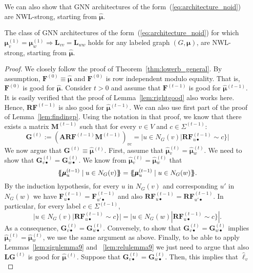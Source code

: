 We can also show that GNN architectures of the form~(\ref{eq:architecture_noid}) 
are NWL-strong, starting from $\hat{\pmb{\mu}}$.
\begin{proposition}
The class of GNN architectures of the form~(\ref{eq:architecture_noid}) for which 
	$\pmb{\mu}^{(1)}_v=\pmb{\mu}^{(1)}_w\Rightarrow  \mathbf{L}_{vv}=\mathbf{L}_{ww}$ holds for any labeled graph $(G,\pmb{\mu})$, are NWL-strong, starting from $\hat{\pmb{\mu}}$.
\end{proposition}
\begin{proof}
We closely follow the proof of Theorem~\ref{thm:lowerb_general}.
 By assumption, $\mathbf{F}^{(0)}\equiv \hat{\pmb{\mu}}$ and $\mathbf{F}^{(0)}$ is 
 row independent modulo equality. That is, $\mathbf{F}^{(0)}$ is good for
 $\hat{\pmb{\mu}}$. Consider $t>0$ and assume that $\mathbf{F}^{(t-1)}$ is good for $\hat{\pmb{\mu}}{}^{(t-1)}$. It is easily verified that the proof of Lemma~\ref{lem:rightgood} also works here. Hence, $\mathbf{R}\mathbf{F}^{(t-1)}$ is also good for  $\hat{\pmb{\mu}}{}^{(t-1)}$. We can also use first part of the proof of Lemma~\ref{lem:findingp}. Using the notation in that proof, we know that there exists a matrix $\mathbf{M}^{(t-1)}$ such that for every $v\in V$ and $c\in\Sigma^{(t-1)}$:
 $$
\mathbf{G}^{(t)}:= (\mathbf{A}\mathbf{R}\mathbf{F}^{(t-1)}\mathbf{M}^{(t-1)})_{vc}=|u\in N_G(v)| \mathbf{R}\mathbf{F}_{u\bullet}^{(t-1)}\sim c\}|
 $$
We now argue that $\mathbf{G}^{(t)}\equiv\hat{\pmb{\mu}}{}^{(t)}$.
First, assume that $\hat{\pmb{\mu}}{}^{(t)}_v=\hat{\pmb{\mu}}{}^{(t)}_w$.
We need to show that $\mathbf{G}^{(t)}_{v\bullet}=\mathbf{G}^{(t)}_{w\bullet}$. We know from 
$\hat{\pmb{\mu}}{}^{(t)}_v=\hat{\pmb{\mu}}{}^{(t)}_w$ that 
$$
\ldbl \pmb{\mu}_u^{(t-1)} \st u \in N_G(v) \rdbl=
\ldbl \pmb{\mu}_u^{(t-1)} \st u \in N_G(w) \rdbl.
$$
By the induction hypothesis, for every $u$ in $N_G(v)$ and corresponding $u'$ in $N_G(w)$ we have $\mathbf{F}^{(t-1)}_{u\bullet}=\mathbf{F}^{(t-1)}_{u'\bullet}$ and also
$\mathbf{R}\mathbf{F}^{(t-1)}_{u\bullet}=\mathbf{R}\mathbf{F}^{(t-1)}_{u'\bullet}$. In particular, for every label $c\in\Sigma^{(t-1)}$, 
$$
|u\in N_G(v)| \mathbf{R}\mathbf{F}_{u\bullet}^{(t-1)}\sim c\}|=
|u\in N_G(w)| \mathbf{R}\mathbf{F}_{u\bullet}^{(t-1)}\sim c\}|.$$
As a consequence, $\mathbf{G}^{(t)}_{v\bullet}=\mathbf{G}^{(t)}_{w\bullet}$.
Conversely, to show that $\mathbf{G}^{(t)}_{v\bullet}=\mathbf{G}^{(t)}_{w\bullet}$ implies 
$\hat{\pmb{\mu}}{}^{(t)}_v=\hat{\pmb{\mu}}{}^{(t)}_w$, we use the same argument as above. Finally, to be able to apply 
 Lemmas~\ref{lem:signlemma9} and
~\ref{lem:relulemma9} we just need to argue that also $\mathbf{L}\mathbf{G}^{(t)}$ is good for $\hat{\pmb{\mu}}{}^{(t)}$.
Suppose that $\mathbf{G}^{(t)}_{v\bullet}=\mathbf{G}^{(t)}_{w\bullet}$.
Then, this implies that $\hat{\pmb{\ell}}_v$

\end{proof}

